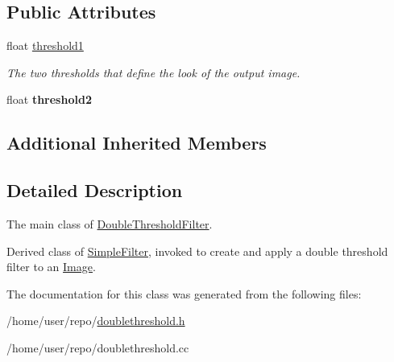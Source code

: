 \subsection*{Public Attributes}
\begin{DoxyCompactItemize}
\item 
\mbox{\label{classDoubleThresholdFilter_a7e42f69279e156d747011690456cea20}} 
float \hyperlink{classDoubleThresholdFilter_a7e42f69279e156d747011690456cea20}{threshold1}
\begin{DoxyCompactList}\small\item\em The two thresholds that define the look of the output image. \end{DoxyCompactList}\item 
\mbox{\label{classDoubleThresholdFilter_ae4f4aafd4245d8682c7456f7430e4886}} 
float {\bfseries threshold2}
\end{DoxyCompactItemize}
\subsection*{Additional Inherited Members}


\subsection{Detailed Description}
The main class of \hyperlink{classDoubleThresholdFilter}{Double\+Threshold\+Filter}. 

Derived class of \hyperlink{classSimpleFilter}{Simple\+Filter}, invoked to create and apply a double threshold filter to an \hyperlink{classImage}{Image}. 

The documentation for this class was generated from the following files\+:\begin{DoxyCompactItemize}
\item 
/home/user/repo/\hyperlink{doublethreshold_8h}{doublethreshold.\+h}\item 
/home/user/repo/doublethreshold.\+cc\end{DoxyCompactItemize}
